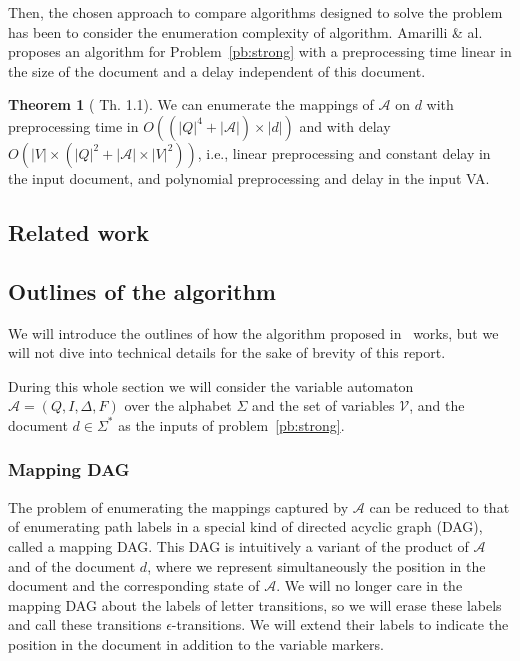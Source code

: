 \documentclass[12px]{article}
\theoremstyle{definition}
\newtheorem{theorem}{Theorem}
\begin{document}
      Then, the chosen approach to compare algorithms designed to solve the
      problem has been to consider the enumeration complexity of algorithm.
      Amarilli \& al.~\cite{ICDT19} proposes an algorithm for
      Problem~\ref{pb:strong} with a preprocessing time linear in the size of
      the document and a delay independent of this document.

      \begin{theorem}[\cite{ICDT19} Th. 1.1]%
        \label{th:master}
        We can enumerate the mappings of $\mathcal{A}$ on $d$ with
        preprocessing time in $O((|Q|^4 + |\mathcal{A}|) \times |d|)$ and with
        delay $O(|V| \times (|Q|^2 + |\mathcal{A}| \times |V|^2))$, i.e.,
        linear preprocessing and constant delay in the input document, and
        polynomial preprocessing and delay in the input VA.
      \end{theorem}

    \subsection{Related work}


    \subsection{Outlines of the algorithm}

      We will introduce the outlines of how the algorithm proposed
      in~\cite{ICDT19} works, but we will not dive into technical details for
      the sake of brevity of this report.

      During this whole section we will consider the variable automaton
      $\mathcal{A} = (Q, I, \Delta, F)$ over the alphabet $\Sigma$ and the set
      of variables $\mathcal{V}$, and the document $d \in \Sigma^*$ as the
      inputs of problem~\ref{pb:strong}.

      \subsubsection{Mapping DAG}%
        \label{sec:mapping_dag}

        The problem of enumerating the mappings captured by $\mathcal{A}$ can
        be reduced to that of enumerating path labels in a special kind of
        directed acyclic graph (DAG), called a mapping DAG. This DAG is
        intuitively a variant of the product of $\mathcal{A}$ and of the
        document $d$, where we represent simultaneously the position in the
        document and the corresponding state of $\mathcal{A}$. We will no
        longer care in the mapping DAG about the labels of letter transitions,
        so we will erase these labels and call these transitions
        $\epsilon$-transitions.  We will extend their labels to indicate the
        position in the document in addition to the variable markers.
\end{document}
